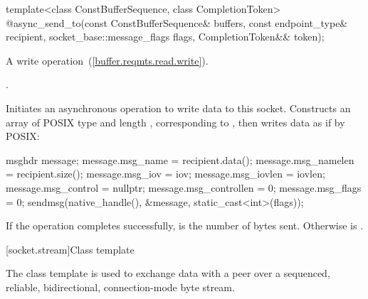 \begin{itemdecl}
template<class ConstBufferSequence, class CompletionToken>
  @\DEDUCED@ async_send_to(const ConstBufferSequence& buffers,
                        const endpoint_type& recipient,
                        socket_base::message_flags flags,
                        CompletionToken&& token);
\end{itemdecl}

\begin{itemdescr}
\pnum
A write operation~(\ref{buffer.reqmts.read.write}).

\pnum
\completionsig {}.

\pnum
\effects Initiates an asynchronous operation to write data to this socket. Constructs an array  of POSIX type  and length , corresponding to , then writes data as if by POSIX:
\begin{codeblock}
msghdr message;
message.msg_name = recipient.data();
message.msg_namelen = recipient.size();
message.msg_iov = iov;
message.msg_iovlen = iovlen;
message.msg_control = nullptr;
message.msg_controllen = 0;
message.msg_flags = 0;
sendmsg(native_handle(), &message, static_cast<int>(flags));
\end{codeblock}


\pnum
If the operation completes successfully,  is the number of bytes sent. Otherwise  is .
\end{itemdescr}




%
[socket.stream]{Class template }

\pnum
The class template  is used to exchange data with a peer over a sequenced, reliable, bidirectional, connection-mode byte stream.

